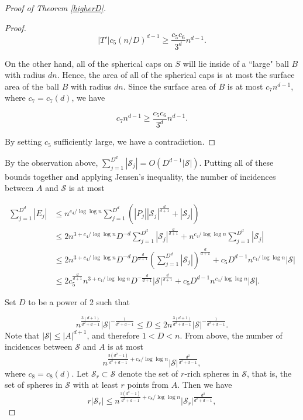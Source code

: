 \documentclass[11pt]{article}
\theoremstyle{plain}
\theoremstyle{definition}
\theoremstyle{remark}
\begin{document}
\begin{proof}[Proof of Theorem \ref{higherD}]
\begin{proof}
$$|T'|c_5(n/D)^{d-1} \geq \frac{c_5c_6}{3^d}n^{d-1}.$$



   \noindent On the other hand, all of the spherical caps on $S$ will lie inside of a ``large" ball $B$ with radius $dn$. Hence, the area of all of the spherical caps is at most the surface area of the ball $B$ with radius $dn$.   Since the surface area of $B$ is at most $c_7n^{d-1}$, where $c_7 = c_7(d)$, we have

   $$c_7n^{d-1} \geq \frac{c_5c_6}{3^d}n^{d-1}.$$

\noindent By setting $c_5$ sufficiently large, we have a contradiction.\end{proof}


By the observation above, $\sum_{j=1}^{D^d} |\mathcal{S}_j| = O(D^{d-1}|\mathcal{S}|)$. Putting all of these bounds together and applying Jensen's inequality, the number of incidences between $A$ and $\mathcal{S}$ is at most

    \begin{align*} \sum_{j=1}^{D^d} |E_j| &\leq n^{c_4/\log\log n}\sum_{j=1}^{D^d}  \left( |P_j||\mathcal{S}_j|^{\frac{d}{d+1}} + |\mathcal{S}_j| \right)\\
     &  \leq 2 n^{3 + c_4/\log\log n}D^{-d}\sum_{j=1}^{D^d}|\mathcal{S}_j|^{\frac{d}{d+1}} + n^{c_4/\log\log n}\sum_{j=1}^{D^d}|\mathcal{S}_j|  \\
    & \leq 2 n^{3 + c_4/\log\log n}D^{-d} D^{\frac{d}{d+1}}\left( \sum_{j=1}^{D^d} |\mathcal{S}_j| \right)^{\frac{d}{d+1}}  + c_5D^{d-1} n^{ c_4/\log\log n} |\mathcal{S}| \\
    & \leq 2 c_5^{\frac{d}{d+1}}n^{3 + c_4/\log\log n}D^{-\frac{d}{d+1}} |\mathcal{S}|^{\frac{d}{d+1}} + c_5D^{d-1} n^{ c_4/\log\log n} |\mathcal{S}|.
    \end{align*}

    Set $D$ to be a power of 2 such that
    
    
    $$   n^{\frac{3(d+1)}{d^2+d-1}} |\mathcal{S}|^{-\frac{1}{d^2+d-1}} \leq D \leq 2 n^{\frac{3(d+1)}{d^2+d-1}} |\mathcal{S}|^{-\frac{1}{d^2+d-1}}.$$ Note that $|\mathcal{S}| \leq |A|^{d+1}$, and therefore $1 < D < n$.  From above, the number of incidences between $\mathcal{S}$ and $A$ is at most$$n^{\frac{3(d^2-1)}{d^2+d-1}+c_8/\log\log n} |\mathcal{S}|^{\frac{d^2}{d^2+d-1}},$$ where $c_8 = c_8(d)$.  Let $\mathcal{S}_r\subset \mathcal{S}$ denote the set of $r$-rich spheres in $\mathcal{S}$, that is, the set of spheres in $\mathcal{S}$ with at least $r$ points from $A$. Then we have $$r|\mathcal{S}_r| \leq n^{\frac{3(d^2-1)}{d^2+d-1}+c_8/\log\log n} |\mathcal{S}_r|^{\frac{d^2}{d^2+d-1}},$$
    

\end{proof}
\end{document}
